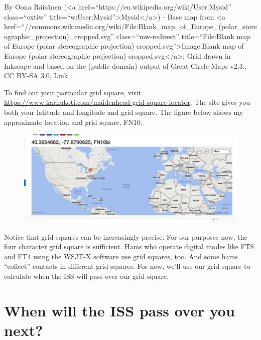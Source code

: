 \documentclass[
  letterpaper,
  DIV=11,
  numbers=noendperiod]{scrreport}
\begin{document}
By Oona Räisänen (\textless a
href=``https://en.wikipedia.org/wiki/User:Mysid'' class=``extiw''
title=``w:User:Mysid''\textgreater Mysid\textless/a\textgreater) - Base
map from \textless a
href=``//commons.wikimedia.org/wiki/File:Blank\_map\_of\_Europe\_(polar\_stereographic\_projection)\_cropped.svg''
class=``mw-redirect'' title=``File:Blank map of Europe (polar
stereographic projection) cropped.svg''\textgreater Image:Blank map of
Europe (polar stereographic projection)
cropped.svg\textless/a\textgreater; Grid drawn in Inkscape and based on
the (public domain) output of Great Circle Maps v2.3., CC BY-SA 3.0,
Link

To find out your particular grid square, visit
\url{https://www.karhukoti.com/maidenhead-grid-square-locator}. The site
gives you both your latitude and longitude and grid square. The figure
below shows my approximate location and grid square, FN10.

\begin{figure}

{\centering \includegraphics{include/img/karhukoti-grid-square.png}

}

\end{figure}

Notice that grid squares can be increasingly precise. For our purposes
now, the four character grid square is sufficient. Hams who operate
digital modes like FT8 and FT4 using the WSJT-X software use grid
squares, too. And some hams ``collect'' contacts in different grid
squares. For now, we'll use our grid square to calculate when the ISS
will pass over our grid square.

\hypertarget{when-will-the-iss-pass-over-you-next}{%
\section*{When will the ISS pass over you
next?}\label{when-will-the-iss-pass-over-you-next}}
\end{document}
